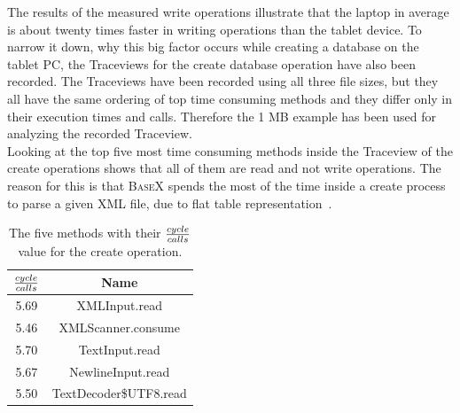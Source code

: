 The results of the measured write operations illustrate that the laptop in average is about twenty times faster in writing operations than the tablet device.
To narrow it down, why this big factor occurs while creating a database on the tablet PC, the Traceviews for the create database operation have also been recorded.
The Traceviews have been recorded using all three file sizes, but they all have the same ordering of top time consuming methods and they differ only in their execution times and calls.
Therefore the 1 MB example has been used for analyzing the recorded Traceview.\\
Looking at the top five most time consuming methods inside the Traceview of the create operations shows that all of them are read and not write operations.
The reason for this is that \textsc{BaseX} spends the most of the time inside a create process to parse a given XML file, due to flat table representation~\cite{grun2010storing}.

\begin{table}[htpb]
	\centering
	\begin{tabular}{|c|c|}
		\hline
		${cycle \over calls}$&Name\\[0.9ex]
		\hline
		5.69&XMLInput.read\\
		\hline
		5.46&XMLScanner.consume\\
		\hline
		5.70&TextInput.read\\
		\hline
		5.67&NewlineInput.read\\
		\hline
		5.50&TextDecoder\$UTF8.read\\
		\hline
	\end{tabular}
	\caption{The five methods with their ${cycle \over calls}$ value for the create operation.}
	\label{tab:top-five-cycle-call-write}
\end{table}

